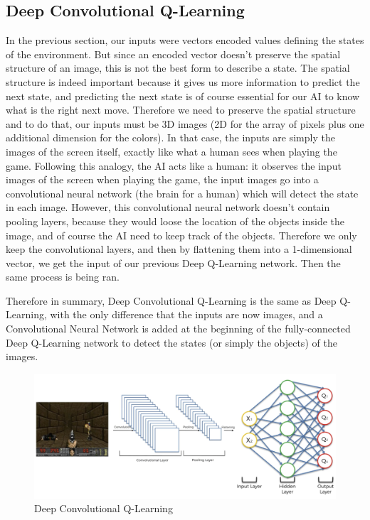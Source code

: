 \documentclass[]{book}
\begin{document}
\subsection{Deep Convolutional Q-Learning}

In the previous section, our inputs were vectors encoded values defining the states of the environment. But since an encoded vector doesn't preserve the spatial structure of an image, this is not the best form to describe a state. The spatial structure is indeed important because it gives us more information to predict the next state, and predicting the next state is of course essential for our AI to know what is the right next move. Therefore we need to preserve the spatial structure and to do that, our inputs must be 3D images (2D for the array of pixels plus one additional dimension for the colors). In that case, the inputs are simply the images of the screen itself, exactly like what a human sees when playing the game. Following this analogy, the AI acts like a human: it observes the input images of the screen when playing the game, the input images go into a convolutional neural network (the brain for a human) which will detect the state in each image. However, this convolutional neural network doesn't contain pooling layers, because they would loose the location of the objects inside the image, and of course the AI need to keep track of the objects. Therefore we only keep the convolutional layers, and then by flattening them into a 1-dimensional vector, we get the input of our previous Deep Q-Learning network. Then the same process is being ran.

Therefore in summary, Deep Convolutional Q-Learning is the same as Deep Q-Learning, with the only difference that the inputs are now images, and a Convolutional Neural Network is added at the beginning of the fully-connected Deep Q-Learning network to detect the states (or simply the objects) of the images.

\begin{figure}[!htbp]
        \begin{center}
            \includegraphics[scale=0.3]{DCQL}
            \caption{Deep Convolutional Q-Learning}
        \end{center}
\end{figure}
\end{document}
